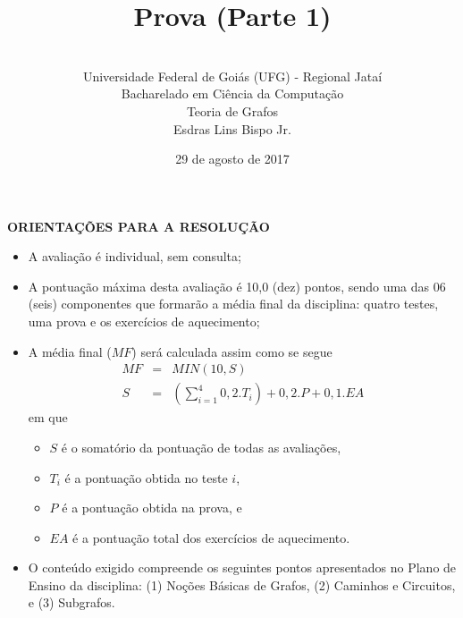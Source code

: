 \documentclass[12pt,a4paper,oneside]{article}
\author{\\Universidade Federal de Goiás (UFG) - Regional Jataí\\Bacharelado em Ciência da Computação \\Teoria de Grafos \\Esdras Lins Bispo Jr.}
\title{\sc \huge Prova (Parte 1)}
\date{29 de agosto de 2017}
\begin{document}
\maketitle

{\bf ORIENTAÇÕES PARA A RESOLUÇÃO}

\footnotesize

\begin{itemize}
	\item A avaliação é individual, sem consulta;
	\item A pontuação máxima desta avaliação é 10,0 (dez) pontos, sendo uma das 06 (seis) componentes que formarão a média final da disciplina: quatro testes, uma prova e os exercícios de aquecimento;
	\item A média final ($MF$) será calculada assim como se segue
	\begin{eqnarray}
		MF & = & MIN(10, S) \nonumber \\
		S & = & (\sum_{i=1}^{4} 0,2.T_i ) + 0,2.P  + 0,1.EA \nonumber
	\end{eqnarray}
	em que 
	\begin{itemize}
		\item $S$ é o somatório da pontuação de todas as avaliações,
		\item $T_i$ é a pontuação obtida no teste $i$,
		\item $P$ é a pontuação obtida na prova, e
		\item $EA$ é a pontuação total dos exercícios de aquecimento.
	\end{itemize}
	\item O conteúdo exigido compreende os seguintes pontos apresentados no Plano de Ensino da disciplina: (1) Noções Básicas de Grafos, (2) Caminhos e Circuitos, e (3) Subgrafos.
\end{itemize}


\begin{center}
\end{center}

\newpage

\normalsize
\end{document}
